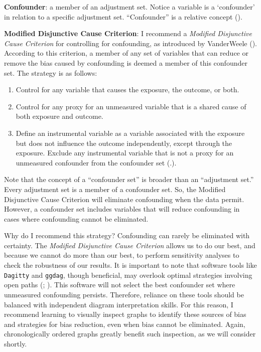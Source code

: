 \documentclass[
  singlecolumn,
  9pt]{article}
\providecommand{\tightlist}{%
  \setlength{\itemsep}{0pt}\setlength{\parskip}{0pt}}\usepackage{longtable,booktabs,array}
\begin{document}
\textbf{Confounder}: a member of an adjustment set. Notice a variable is
a `confounder' in relation to a specific adjustment set. ``Confounder''
is a relative concept ().

\textbf{Modified Disjunctive Cause Criterion}: I recommend a
\emph{Modified Disjunctive Cause Criterion} for controlling for
confounding, as introduced by VanderWeele
(). According to this criterion, a
member of any set of variables that can reduce or remove the bias caused
by confounding is deemed a member of this confounder set. The strategy
is as follows:

\begin{enumerate}
\def\labelenumi{\alph{enumi}.}
\tightlist
\item
  Control for any variable that causes the exposure, the outcome, or
  both.
\item
  Control for any proxy for an unmeasured variable that is a shared
  cause of both exposure and outcome.
\item
  Define an instrumental variable as a variable associated with the
  exposure but does not influence the outcome independently, except
  through the exposure. Exclude any instrumental variable that is not a
  proxy for an unmeasured confounder from the confounder set
  (.).
\end{enumerate}

Note that the concept of a ``confounder set'' is broader than an
``adjustment set.'' Every adjustment set is a member of a confounder
set. So, the Modified Disjunctive Cause Criterion will eliminate
confounding when the data permit. However, a confounder set includes
variables that will reduce confounding in cases where confounding cannot
be eliminated.

Why do I recommend this strategy? Confounding can rarely be eliminated
with certainty. The \emph{Modified Disjunctive Cause Criterion} allows
us to do our best, and because we cannot do more than our best, to
perform sensitivity analyses to check the robustness of our results. It
is important to note that software tools like \texttt{Dagitty} and
\texttt{ggdag}, though beneficial, may overlook optimal strategies
involving open paths (;
). This software
will not select the best confounder set where unmeasured confounding
persists. Therefore, reliance on these tools should be balanced with
independent diagram interpretation skills. For this reason, I recommend
learning to visually inspect graphs to identify these sources of bias
and strategies for bias reduction, even when bias cannot be eliminated.
Again, chronologically ordered graphs greatly benefit such inspection,
as we will consider shortly.
\end{document}
